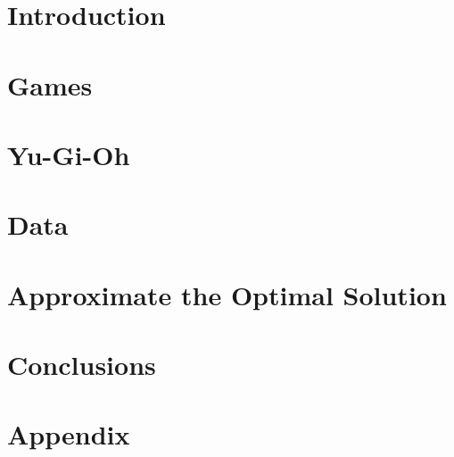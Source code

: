 \documentclass[12pt, letterpaper]{article}
\begin{document}



\section{Introduction}



\section{Games}


\FloatBarrier
\section{Yu-Gi-Oh}



\section{Data}



\section{Approximate the Optimal Solution}



\section{Conclusions}


\FloatBarrier
\section*{Appendix}
\appendix


\FloatBarrier
\nocite{*}


\end{document}
